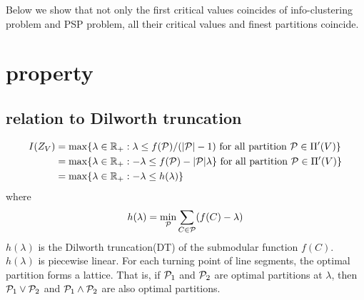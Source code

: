 \documentclass{article}
\begin{document}
Below we show that not only the first critical values coincides of info-clustering problem and PSP problem, all their critical values 
and finest partitions coincide.

\section{property}
\subsection{relation to Dilworth truncation}
\begin{align}
I(Z_V) &= \max\{ \lambda \in \R_+: \lambda \leq f(\P)/(\abs{\P} - 1) \text{ for all partition } \P \in \Pi'(V)\} \\
& = \max\{ \lambda \in \R_+:  -\lambda \leq f(\P) - \abs{\P} \lambda \} \text{ for all partition } \P \in \Pi'(V)\} \\
\label{eq:Connection}& = \max\{ \lambda \in \R_+: -\lambda \leq h(\lambda)\}
\end{align}
where 
\begin{equation}\label{eq:hLambda}
h(\lambda) = \min_{\P} \sum_{C\in \P} (f(C)-\lambda)
\end{equation}
$h(\lambda)$ is the Dilworth truncation(DT) of the submodular function $f(C)$. $h(\lambda)$
is piecewise linear. For each turning point of line segments, the optimal partition forms a lattice. That is, if $\P_1$ and $\P_2$ are optimal partitions at $\lambda$, then $\P_1\vee \P_2$ and $\P_1 \wedge \P_2$ are also optimal partitions.
\end{document}
